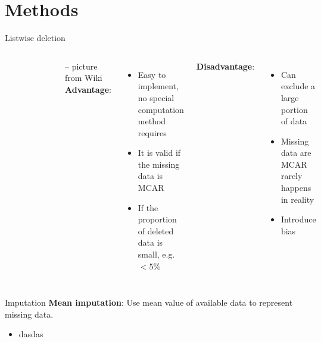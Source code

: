 \documentclass{beamer}
\begin{document}
\section{Methods}
\begin{frame}{Listwise deletion}
\begin{columns}[c] 
	
\begin{figure}[h!]
	\includegraphics[width=\textwidth]{listwise.png}
\end{figure}
-- picture from Wiki
\textbf{Advantage}:\\
\begin{itemize}
\item{Easy to implement, no special computation method requires}
\item{It is valid if the missing data is MCAR}
\item{If the proportion of deleted data is small, e.g. $<5\%$}
\end{itemize}
\textbf{Disadvantage}:\\
\begin{itemize}
	\item{Can exclude a large portion of data}
	\item{Missing data are MCAR rarely happens in reality}
	\item{Introduce bias}
\end{itemize}
\end{columns}


\end{frame}
\begin{frame}{Imputation}
\textbf{Mean imputation}: Use mean value of available data to represent missing data.
\begin{itemize}
\item dasdas
\end{itemize}	
\end{frame}
\end{document}
